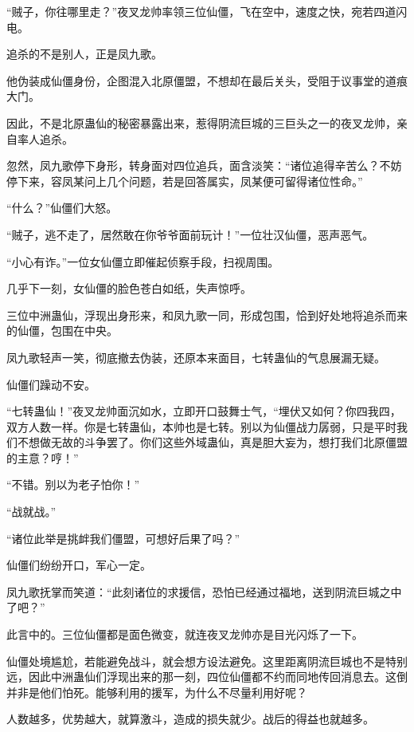 
\begin{this_body}



“贼子，你往哪里走？”夜叉龙帅率领三位仙僵，飞在空中，速度之快，宛若四道闪电。

追杀的不是别人，正是凤九歌。

他伪装成仙僵身份，企图混入北原僵盟，不想却在最后关头，受阻于议事堂的道痕大门。

因此，不是北原蛊仙的秘密暴露出来，惹得阴流巨城的三巨头之一的夜叉龙帅，亲自率人追杀。

忽然，凤九歌停下身形，转身面对四位追兵，面含淡笑：“诸位追得辛苦么？不妨停下来，容凤某问上几个问题，若是回答属实，凤某便可留得诸位性命。”

“什么？”仙僵们大怒。

“贼子，逃不走了，居然敢在你爷爷面前玩计！”一位壮汉仙僵，恶声恶气。

“小心有诈。”一位女仙僵立即催起侦察手段，扫视周围。

几乎下一刻，女仙僵的脸色苍白如纸，失声惊呼。

三位中洲蛊仙，浮现出身形来，和凤九歌一同，形成包围，恰到好处地将追杀而来的仙僵，包围在中央。

凤九歌轻声一笑，彻底撤去伪装，还原本来面目，七转蛊仙的气息展漏无疑。

仙僵们躁动不安。

“七转蛊仙！”夜叉龙帅面沉如水，立即开口鼓舞士气，“埋伏又如何？你四我四，双方人数一样。你是七转蛊仙，本帅也是七转。别以为仙僵战力孱弱，只是平时我们不想做无故的斗争罢了。你们这些外域蛊仙，真是胆大妄为，想打我们北原僵盟的主意？哼！”

“不错。别以为老子怕你！”

“战就战。”

“诸位此举是挑衅我们僵盟，可想好后果了吗？”

仙僵们纷纷开口，军心一定。

凤九歌抚掌而笑道：“此刻诸位的求援信，恐怕已经通过福地，送到阴流巨城之中了吧？”

此言中的。三位仙僵都是面色微变，就连夜叉龙帅亦是目光闪烁了一下。

仙僵处境尴尬，若能避免战斗，就会想方设法避免。这里距离阴流巨城也不是特别远，因此中洲蛊仙们浮现出来的那一刻，四位仙僵都不约而同地传回消息去。这倒并非是他们怕死。能够利用的援军，为什么不尽量利用好呢？

人数越多，优势越大，就算激斗，造成的损失就少。战后的得益也就越多。


\end{this_body}
